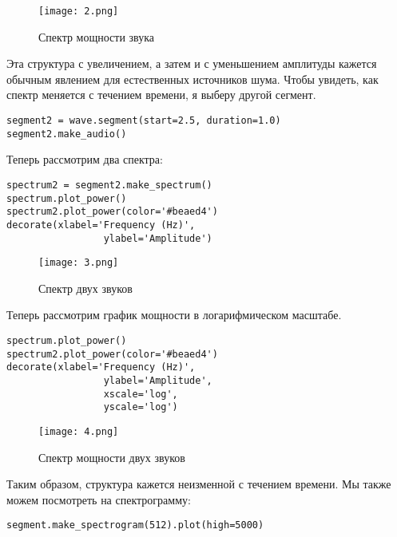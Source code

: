 \documentclass[a4paper,12pt]{report}
\begin{document}
\begin{figure}[H]
        \centering
        \texttt{[image: 2.png]}
        \caption{Спектр мощности звука}
        \label{fig:lab4_fig1_2}
\end{figure}

Эта структура с увеличением, а затем и с уменьшением амплитуды кажется обычным явлением для естественных источников шума. Чтобы увидеть, как спектр меняется с течением времени, я выберу другой сегмент.

\begin{lstlisting}[caption=Выбор другого сегмента звука]
segment2 = wave.segment(start=2.5, duration=1.0)
segment2.make_audio()
\end{lstlisting}

Теперь рассмотрим два спектра:

\begin{lstlisting}[caption=Спектр двух звуков]
spectrum2 = segment2.make_spectrum()
spectrum.plot_power()
spectrum2.plot_power(color='#beaed4')
decorate(xlabel='Frequency (Hz)',
                 ylabel='Amplitude')
\end{lstlisting}

\begin{figure}[H]
        \centering
        \texttt{[image: 3.png]}
        \caption{Спектр двух звуков}
        \label{fig:lab4_fig1_3}
\end{figure}

Теперь рассмотрим график мощности в логарифмическом масштабе.

\begin{lstlisting}[caption=Спектр мощности двух звуков]
spectrum.plot_power()
spectrum2.plot_power(color='#beaed4')
decorate(xlabel='Frequency (Hz)',
                 ylabel='Amplitude',
                 xscale='log', 
                 yscale='log')
\end{lstlisting}

\begin{figure}[H]
        \centering
        \texttt{[image: 4.png]}
        \caption{Спектр мощности двух звуков}
        \label{fig:lab4_fig1_4}
\end{figure}

Таким образом, структура кажется неизменной с течением времени. Мы также можем посмотреть на спектрограмму:

\begin{lstlisting}[caption=Спектрограмма звука]
segment.make_spectrogram(512).plot(high=5000)
\end{lstlisting}
\end{document}
